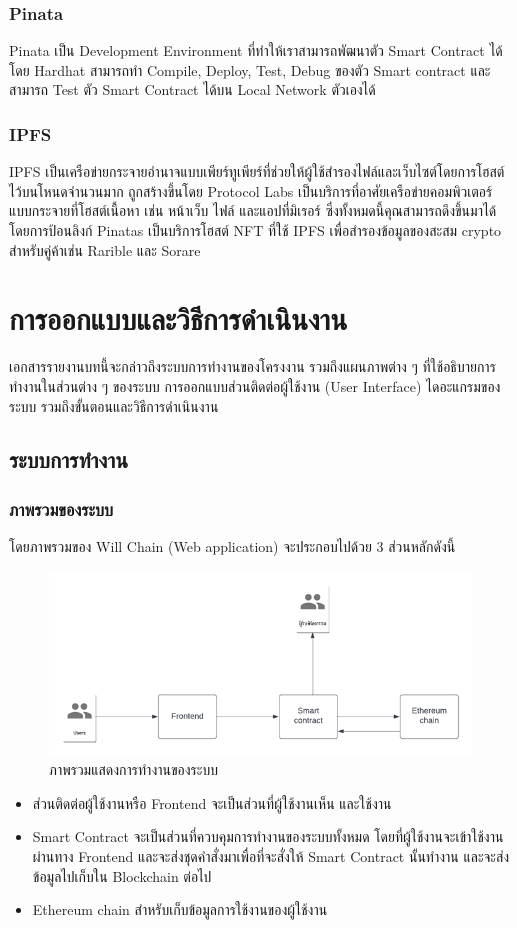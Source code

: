 \documentclass[12pt,oneside,openright,a4paper]{cpe-thai-project}
\begin{document}
\subsection{Pinata \cite{pinata}}
\tab Pinata เป็น Development Environment ที่ทำให้เราสามารถพัฒนาตัว Smart Contract ได้โดย Hardhat สามารถทำ Compile, Deploy, Test, Debug ของตัว Smart contract และ สามารถ Test ตัว Smart Contract ได้บน Local Network ตัวเองได้

\subsection{IPFS \cite{ipfs}}
\tab IPFS เป็นเครือข่ายกระจายอำนาจแบบเพียร์ทูเพียร์ที่ช่วยให้ผู้ใช้สำรองไฟล์และเว็บไซต์โดยการโฮสต์ไว้บนโหนดจำนวนมาก ถูกสร้างขึ้นโดย Protocol Labs เป็นบริการที่อาศัยเครือข่ายคอมพิวเตอร์แบบกระจายที่โฮสต์เนื้อหา เช่น หน้าเว็บ ไฟล์ และแอปที่มิเรอร์ ซึ่งทั้งหมดนี้คุณสามารถดึงขึ้นมาได้โดยการป้อนลิงก์
Pinatas เป็นบริการโฮสต์ NFT ที่ใช้ IPFS เพื่อสำรองข้อมูลของสะสม crypto สำหรับคู่ค้าเช่น Rarible และ Sorare


\chapter{การออกแบบและวิธีการดำเนินงาน}
\tab เอกสารรายงานบทนี้จะกล่าวถึงระบบการทำงานของโครงงาน รวมถึงแผนภาพต่าง ๆ ที่ใช้อธิบายการทำงานในส่วนต่าง ๆ ของระบบ การออกแบบส่วนติดต่อผู้ใช้งาน (User Interface) ไดอะแกรมของระบบ รวมถึงขั้นตอนและวิธีการดำเนินงาน
\section{ระบบการทำงาน}
\subsection{ภาพรวมของระบบ}
\tab โดยภาพรวมของ Will Chain (Web application) จะประกอบไปด้วย 3 ส่วนหลักดังนี้
	\begin{figure}[h]
		\centering
		\includegraphics[scale=0.8]{Overall_system}
		\caption{ภาพรวมแสดงการทำงานของระบบ}
	\end{figure}
	\begin{itemize}[leftmargin=0pt,itemindent=2.5cm]
		\item ส่วนติดต่อผู้ใช้งานหรือ Frontend จะเป็นส่วนที่ผู้ใช้งานเห็น และใช้งาน
		\item Smart Contract จะเป็นส่วนที่ควบคุมการทำงานของระบบทั้งหมด โดยที่ผู้ใช้งานจะเข้าใช้งานผ่านทาง Frontend และจะส่งชุดคำสั่งมาเพื่อที่จะสั่งให้ Smart Contract นั้นทำงาน และจะส่งข้อมูลไปเก็บใน Blockchain ต่อไป
		\item Ethereum chain สำหรับเก็บข้อมูลการใช้งานของผู้ใช้งาน
	\end{itemize}
\end{document}
